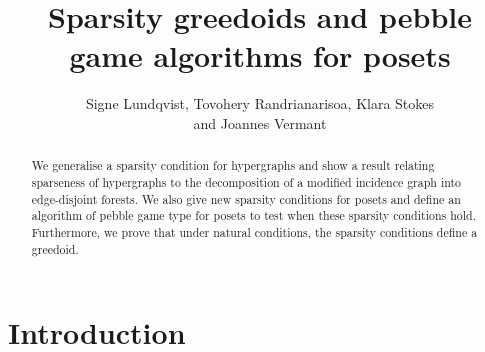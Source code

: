 \documentclass{article}
\title{Sparsity greedoids and pebble game algorithms for posets}
\author{Signe Lundqvist, Tovohery Randrianarisoa, Klara Stokes \\ and Joannes Vermant}
\begin{document}
\maketitle
\newtheorem{theorem}{Theorem}
\newtheorem{proposition}[theorem]{Proposition}
\newtheorem{lemma}[theorem]{Lemma}
\newtheorem{corollary}[theorem]{Corollary}
\newtheorem{rem
ark}[theorem]{Remark}
\newtheorem{definition}[theorem]{Definition}
\newtheorem{example}[theorem]{Example}
\newcommand{\out}{\textup{out}} 
\newcommand{\spa}{\textup{span}} 
\newcommand{\Stab}{\textup{Stab}} 
\newcommand{\peb}{\textup{peb}} 

\newcommand{\AcceptEdge}[1]{\textbf{Accept-Edge}(#1)}
\newcommand{\MovePebble}[1]{\textbf{Move-Pebble}(#1)}


\begin{abstract}
\noindent We generalise a sparsity condition for hypergraphs and show a result relating sparseness of hypergraphs to the decomposition of 
a modified incidence graph into edge-disjoint forests. We also give new sparsity conditions for posets and define an algorithm of pebble game type for posets to test when these sparsity conditions hold. Furthermore, we prove that under natural conditions, the sparsity conditions define a greedoid.  
\end{abstract}

\section{Introduction}

\end{document}
